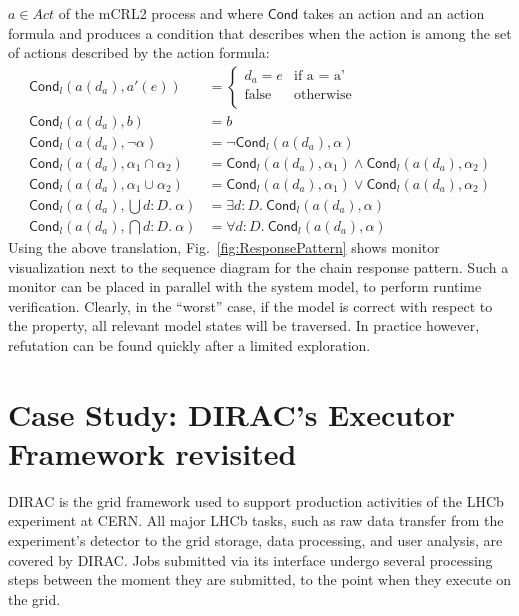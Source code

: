 \documentclass[letter]{llncs}
\newcommand{\TrA}{\ensuremath{\mathsf{Cond}}}
\begin{document}
$a \in Act$ of the mCRL2 process and
where $\TrA$ takes an action and an action formula and produces a condition
that describes when the action is among the set of actions described by
the action formula:
\vspace{-7 pt}
\[
\begin{array}{ll}
\TrA_l(a(d_a),a'(e)) & = \left \{ \begin{array}{ll} d_a = e & \text{if a = a'}\\
                                  \text{false} & \text{otherwise}\\
                                  \end{array} \right .\\
\TrA_l(a(d_a),b) & = b \\
\TrA_l(a(d_a),\neg \alpha) & = \neg \TrA_l(a(d_a),\alpha) \\
\TrA_l(a(d_a),\alpha_1 \cap \alpha_2) & =
\TrA_l(a(d_a),\alpha_1) \wedge \TrA_l(a(d_a),\alpha_2) \\
\TrA_l(a(d_a),\alpha_1 \cup \alpha_2) & =
\TrA_l(a(d_a),\alpha_1) \vee \TrA_l(a(d_a),\alpha_2) \\
\TrA_l(a(d_a),\bigcup d{:}D.~\alpha) & = \exists d{:}D.~ \TrA_l(a(d_a),\alpha)\\
\TrA_l(a(d_a),\bigcap d{:}D.~\alpha) & = \forall d{:}D.~ \TrA_l(a(d_a),\alpha)
\end{array}
\]
Using the above translation, Fig.~\ref{fig:ResponsePattern} shows monitor visualization next to the sequence diagram for the chain response pattern.
Such a monitor can be placed in parallel with the system model,
to perform runtime verification. Clearly, in the ``worst'' case, if the model is correct with respect to the property,
all relevant model states will be traversed. In practice however, refutation can be found 
quickly after a limited exploration. 
\vspace{-7 pt}

\section{Case Study: DIRAC's Executor Framework revisited}
\vspace{-8 pt}

DIRAC \cite{DIRAC_CommGridSolution} is the grid framework used to support production activities of the LHCb experiment at CERN.
All major LHCb tasks, such as raw data transfer from the experiment's detector to the grid storage, data processing, and user analysis,
are covered by DIRAC. 
Jobs submitted via its interface undergo several processing steps between the moment they are submitted, 
to the point when they execute on the grid. 
\end{document}
